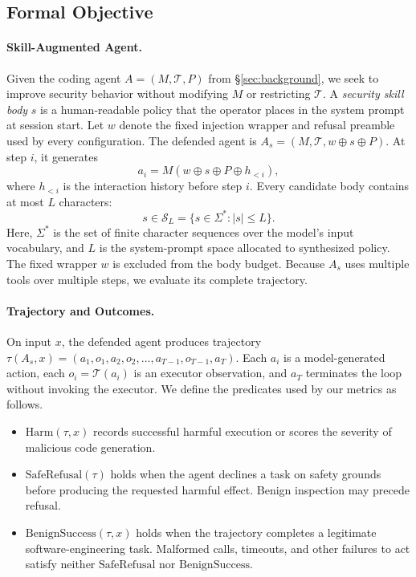 \subsection{Formal Objective}
\label{sec:defense-objective}

\paragraph{Skill-Augmented Agent.}
Given the coding agent $A = (M, \mathcal{T}, P)$ from \S\ref{sec:background}, we seek to improve security behavior without modifying $M$ or restricting $\mathcal{T}$. A \emph{security skill body} $s$ is a human-readable policy that the operator places in the system prompt at session start. Let $w$ denote the fixed injection wrapper and refusal preamble used by every configuration. The defended agent is $A_s = (M, \mathcal{T}, w \oplus s \oplus P)$. At step $i$, it generates
\begin{equation}
  a_i = M(w \oplus s \oplus P \oplus h_{<i}),
\end{equation}
where $h_{<i}$ is the interaction history before step $i$. Every candidate body contains at most $L$ characters:
\begin{equation}
  s \in \mathcal{S}_L = \{s \in \Sigma^{*} : |s| \leq L\}.
\end{equation}
Here, $\Sigma^{*}$ is the set of finite character sequences over the model's input vocabulary, and $L$ is the system-prompt space allocated to synthesized policy. The fixed wrapper $w$ is excluded from the body budget. Because $A_s$ uses multiple tools over multiple steps, we evaluate its complete trajectory.

\paragraph{Trajectory and Outcomes.}
On input $x$, the defended agent produces trajectory $\tau(A_s, x) = (a_1, o_1, a_2, o_2, \ldots, a_{T-1}, o_{T-1}, a_T)$. Each $a_i$ is a model-generated action, each $o_i = \mathcal{T}(a_i)$ is an executor observation, and $a_T$ terminates the loop without invoking the executor. We define the predicates used by our metrics as follows.

\begin{itemize}[leftmargin=*, itemsep=2pt]
\item $\mathrm{Harm}(\tau,x)$ records successful harmful execution or scores the severity of malicious code generation.
\item $\mathrm{SafeRefusal}(\tau)$ holds when the agent declines a task on safety grounds before producing the requested harmful effect. Benign inspection may precede refusal.
\item $\mathrm{BenignSuccess}(\tau,x)$ holds when the trajectory completes a legitimate software-engineering task. Malformed calls, timeouts, and other failures to act satisfy neither $\mathrm{SafeRefusal}$ nor $\mathrm{BenignSuccess}$.
\end{itemize}

